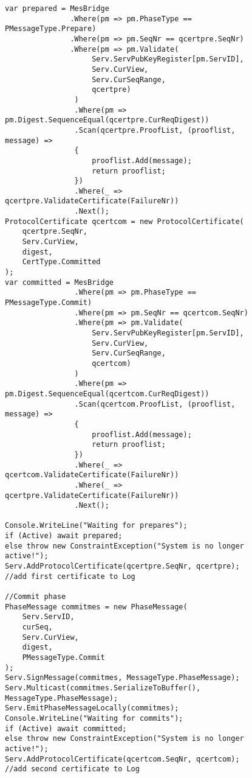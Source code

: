 \begin{figure}[H]
	\centering
	\begin{lstlisting}[label = code:PrepareAndCommit, caption=Source code for Prepare and Commit phase, captionpos = b, basicstyle=\scriptsize]
var prepared = MesBridge
               .Where(pm => pm.PhaseType == PMessageType.Prepare)
               .Where(pm => pm.SeqNr == qcertpre.SeqNr)
               .Where(pm => pm.Validate(
                    Serv.ServPubKeyRegister[pm.ServID], 
                    Serv.CurView, 
                    Serv.CurSeqRange, 
                    qcertpre)
                )
                .Where(pm => pm.Digest.SequenceEqual(qcertpre.CurReqDigest))
                .Scan(qcertpre.ProofList, (prooflist, message) =>
                {
                    prooflist.Add(message);
                    return prooflist;
                })
                .Where(_ => qcertpre.ValidateCertificate(FailureNr))
                .Next();
ProtocolCertificate qcertcom = new ProtocolCertificate(
    qcertpre.SeqNr, 
    Serv.CurView, 
    digest, 
    CertType.Committed
);   
var committed = MesBridge
                .Where(pm => pm.PhaseType == PMessageType.Commit)
                .Where(pm => pm.SeqNr == qcertcom.SeqNr)
                .Where(pm => pm.Validate(
                    Serv.ServPubKeyRegister[pm.ServID], 
                    Serv.CurView, 
                    Serv.CurSeqRange, 
                    qcertcom)
                )
                .Where(pm => pm.Digest.SequenceEqual(qcertcom.CurReqDigest))
                .Scan(qcertcom.ProofList, (prooflist, message) =>
                {
                    prooflist.Add(message);
                    return prooflist;
                })
                .Where(_ => qcertcom.ValidateCertificate(FailureNr))
                .Where(_ => qcertpre.ValidateCertificate(FailureNr))
                .Next();
                
Console.WriteLine("Waiting for prepares");
if (Active) await prepared;
else throw new ConstraintException("System is no longer active!");
Serv.AddProtocolCertificate(qcertpre.SeqNr, qcertpre); //add first certificate to Log

//Commit phase
PhaseMessage commitmes = new PhaseMessage(
    Serv.ServID, 
    curSeq, 
    Serv.CurView, 
   	digest, 
    PMessageType.Commit
);
Serv.SignMessage(commitmes, MessageType.PhaseMessage);
Serv.Multicast(commitmes.SerializeToBuffer(), MessageType.PhaseMessage);
Serv.EmitPhaseMessageLocally(commitmes);
Console.WriteLine("Waiting for commits");
if (Active) await committed;
else throw new ConstraintException("System is no longer active!");
Serv.AddProtocolCertificate(qcertcom.SeqNr, qcertcom); //add second certificate to Log
	\end{lstlisting}
\end{figure}


